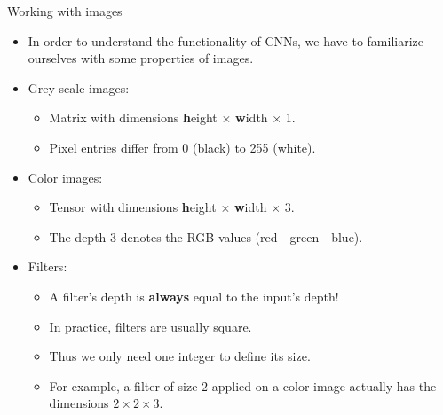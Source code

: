 \documentclass[11pt,compress,t,notes=noshow, xcolor=table]{beamer}
\begin{document}
\begin{frame}{Working with images}
  \begin{itemize}
  \item In order to understand the functionality of CNNs, we have to familiarize ourselves with some properties of images.
  \item Grey scale images:
  \begin{itemize}
    \item Matrix with dimensions \textbf{h}eight $\times$ \textbf{w}idth $\times$ 1.
    \item Pixel entries differ from 0 (black) to 255 (white).
  \end{itemize}
  \item Color images:
  \begin{itemize}
    \item Tensor with dimensions \textbf{h}eight $\times$ \textbf{w}idth $\times$ 3.
    \item The depth 3 denotes the RGB values (red - green - blue).
  \end{itemize}
  \item Filters:
  \begin{itemize}
    \item A filter's depth is \textbf{always} equal to the input's depth!
    \item In practice, filters are usually square.
    \item Thus we only need one integer to define its size.
    \item For example, a filter of size $2$ applied on a color image actually has the dimensions $2 \times 2 \times 3$.
  \end{itemize}
  \end{itemize}
\end{frame}
\end{document}
